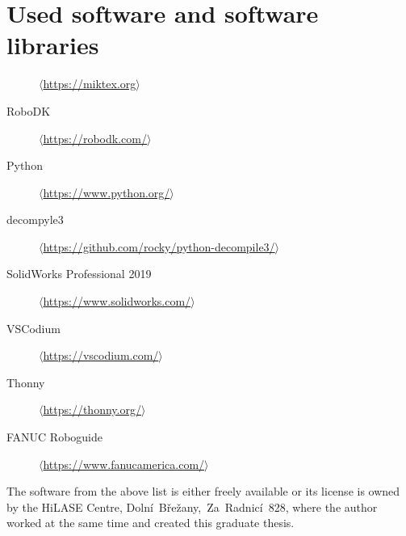 ﻿\chapter{Used software and software libraries \label{ch:ApendSW}}



\begin{description}
    \item[\LaTeXe]
            \href{https://miktex.org/}
            {$\langle$https://miktex.org$\rangle$}
            
    \item[RoboDK]
            \href{https://robodk.com/}
            {$\langle$https://robodk.com/$\rangle$}
            
    \item[Python]
            \href{https://www.python.org/}
            {$\langle$https://www.python.org/$\rangle$}
    
    \item[decompyle3]
            \href{https://github.com/rocky/python-decompile3/}
            {$\langle$https://github.com/rocky/python-decompile3/$\rangle$}
            
    \item[SolidWorks Professional 2019]
            \href{https://www.solidworks.com/}
            {$\langle$https://www.solidworks.com/$\rangle$}
            
    \item[VSCodium]
            \href{https://vscodium.com/}
            {$\langle$https://vscodium.com/$\rangle$}
            
    \item[Thonny]
            \href{https://thonny.org/}
            {$\langle$https://thonny.org/$\rangle$}
            
    \item[FANUC Roboguide]
            \href{https://www.fanucamerica.com/products/robots/robot-simulation-software-FANUC-ROBOGUIDE}
            {$\langle$https://www.fanucamerica.com/$\rangle$}
\end{description}

The software from the above list is either freely available or its license is owned by the HiLASE Centre, Dolní~Břežany,~Za~Radnicí~828, where the author worked at the same time and created this graduate thesis.



